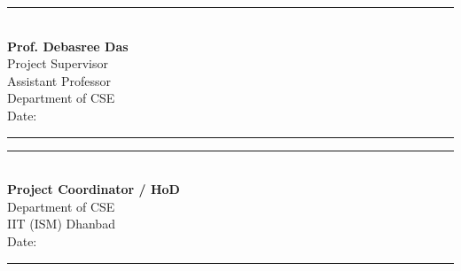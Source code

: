 \noindent
\begin{minipage}{0.48\textwidth}
	\begin{flushleft}
		\rule{0.8\textwidth}{0.4pt}\\
		\textbf{Prof. Debasree Das}\\
		Project Supervisor\\
		Assistant Professor\\
		Department of CSE\\
		Date: \rule{0.4\textwidth}{0.4pt}
	\end{flushleft}
\end{minipage}
\hfill
\begin{minipage}{0.48\textwidth}
	\begin{flushright}
		\rule{0.8\textwidth}{0.4pt}\\
		\textbf{Project Coordinator / HoD}\\
		Department of CSE\\
		IIT (ISM) Dhanbad\\
		Date: \rule{0.4\textwidth}{0.4pt}
	\end{flushright}
\end{minipage}

\vfill
